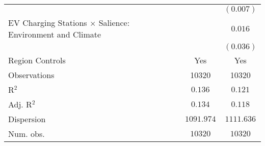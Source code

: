 \begin{center}
\begin{tiny}
\begin{longtable}{l@{} c@{} c@{}}
                                                                         &                  & $(0.007)$        \\
\quad EV Charging Stations $\times$ Salience: Environment and Climate    &                  & $0.016$          \\
                                                                         &                  & $(0.036)$        \\
\hline
Region Controls                                                          & Yes              & Yes              \\
Observations                                                             & 10320            & 10320            \\
R$^2$                                                                    & $0.136$          & $0.121$          \\
Adj. R$^2$                                                               & $0.134$          & $0.118$          \\
Dispersion                                                               & $1091.974$       & $1111.636$       \\
Num. obs.                                                                & $10320$          & $10320$          \\
\end{longtable}
\end{tiny}
\end{center}
